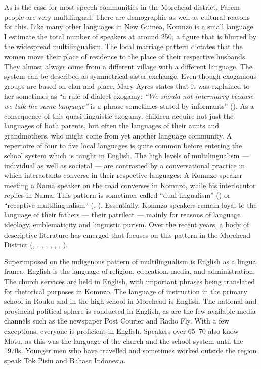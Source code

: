 As is the case for most speech communities in the Morehead district, Farem people are very multilingual. There are demographic as well as cultural reasons for this. Like many other languages in New Guinea, Komnzo is a small language. I estimate the total number of speakers at around 250, a figure that is blurred by the widespread multilingualism. The local marriage pattern dictates that the women move their place of residence to the place of their respective husbands. They almost always come from a different village with a different language. The system can be described as symmetrical sister-exchange. Even though exogamous groups are based on clan and place, Mary Ayres states that it was explained to her sometimes as ``a rule of dialect exogamy: \emph{``We should not intermarry because we talk the same language''} is a phrase sometimes stated by informants'' (\citeyear[186]{Ayres:1983dw}). As a consequence of this quasi-linguistic exogamy, children acquire not just the languages of both parents, but often the languages of their aunts and grandmothers, who might come from yet another language community. A repertoire of four to five local languages is quite common before entering the school system which is taught in English. The high levels of multilingualism — individual as well as societal — are contrasted by a conversational practice in which interactants converse in their respective languages: A Komnzo speaker meeting a Nama speaker on the road converses in Komnzo, while his interlocutor replies in Nama. This pattern is sometimes called ``dual-lingualism'' (\cite{Lincoln:1979vs}) or ``receptive multilingualism'' (\cite{Rehbein:2011ft}, \cite{Singer:2023zj}). Essentially, Komnzo speakers remain loyal to the language of their fathers — their patrilect — mainly for reasons of language ideology, emblematicity and linguistic purism. Over the recent years, a body of descriptive literature has emerged that focuses on this pattern in the Morehead District (\cite{Evans:2012cq}, \cite{Evans:2017lf}, \cite[34-36]{Dohler:2018qt}, \cite{Kashima:2020va}, \cite{Dohler:2021tb}, \cite{Schokkin:2021ct}, \cite{Schokkin:2023dz}, \cite{Dohler:2024kd}).

Superimposed on the indigenous pattern of multilingualism is English as a lingua franca. English is the language of religion, education, media, and administration. The church services are held in English, with important phrases being translated for rhetorical purposes in Komnzo. The language of instruction in the primary school in Rouku and in the high school in Morehead is English. The national and provincial political sphere is conducted in English, as are the few available media channels such as the newspaper Post Courier and Radio Fly. With a few exceptions, everyone is proficient in English. Speakers over 65–70 also know Motu, as this was the language of the church and the school system until the 1970s. Younger men who have travelled and sometimes worked outside the region speak Tok Pisin and Bahasa Indonesia.

